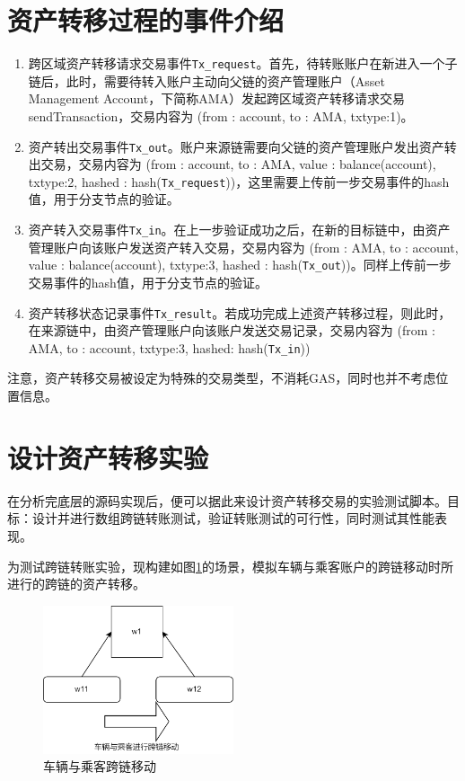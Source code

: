 \section{资产转移过程的事件介绍}

\begin{enumerate}
    \item 跨区域资产转移请求交易事件\verb|Tx_request|。首先，待转账账户在新进入一个子链后，此时，需要待转入账户主动向父链的资产管理账户（Asset Management Account，下简称AMA）发起跨区域资产转移请求交易sendTransaction，交易内容为 (from : account, to : AMA, txtype:1)。
    \item 资产转出交易事件\verb|Tx_out|。账户来源链需要向父链的资产管理账户发出资产转出交易，交易内容为 (from : account, to : AMA, value : balance(account), txtype:2, hashed : hash(\verb|Tx_request|))，这里需要上传前一步交易事件的hash值，用于分支节点的验证。
    \item 资产转入交易事件\verb|Tx_in|。在上一步验证成功之后，在新的目标链中，由资产管理账户向该账户发送资产转入交易，交易内容为 (from : AMA, to : account, value : balance(account), txtype:3, hashed : hash(\verb|Tx_out|))。同样上传前一步交易事件的hash值，用于分支节点的验证。
    \item 资产转移状态记录事件\verb|Tx_result|。若成功完成上述资产转移过程，则此时，在来源链中，由资产管理账户向该账户发送交易记录，交易内容为 (from : AMA, to : account, txtype:3, hashed: hash(\verb|Tx_in|))
\end{enumerate}

注意，资产转移交易被设定为特殊的交易类型，不消耗GAS，同时也并不考虑位置信息。

\section{设计资产转移实验}

在分析完底层的源码实现后，便可以据此来设计资产转移交易的实验测试脚本。目标：设计并进行数组跨链转账测试，验证转账测试的可行性，同时测试其性能表现。

为测试跨链转账实验，现构建如图\ref{fig:车辆与乘客跨链移动}的场景，模拟车辆与乘客账户的跨链移动时所进行的跨链的资产转移。

\begin{figure}
	\centering
	\includegraphics[width=0.5\textwidth]{figures/车辆与乘客跨链移动.png}
	\caption{车辆与乘客跨链移动}
	\label{fig:车辆与乘客跨链移动}
\end{figure}

